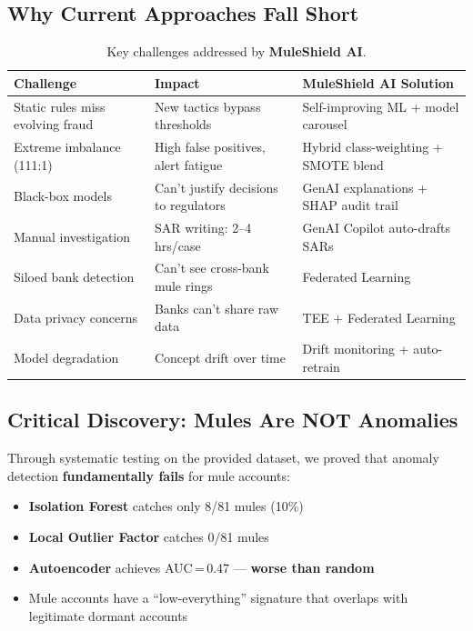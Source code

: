 \documentclass[11pt, a4paper]{article}
\newcommand{\muleshield}{\textbf{\textcolor{mainblue}{MuleShield AI}}}
\begin{document}
\subsection{Why Current Approaches Fall Short}

\begin{table}[H]
\centering
\small
{}
\begin{tabularx}{\textwidth}{L{3.5cm} Y Y}
\toprule
{}
\textbf{Challenge} & \textbf{Impact} & \textbf{MuleShield AI Solution} \\
\midrule
Static rules miss evolving fraud & New tactics bypass thresholds & Self-improving ML + model carousel \\
Extreme imbalance (111:1) & High false positives, alert fatigue & Hybrid class-weighting + SMOTE blend \\
Black-box models & Can't justify decisions to regulators & GenAI explanations + SHAP audit trail \\
Manual investigation & SAR writing: 2--4 hrs/case & GenAI Copilot auto-drafts SARs \\
Siloed bank detection & Can't see cross-bank mule rings & Federated Learning \\
Data privacy concerns & Banks can't share raw data & TEE + Federated Learning \\
Model degradation & Concept drift over time & Drift monitoring + auto-retrain \\
\bottomrule
\end{tabularx}
\caption{Key challenges addressed by \muleshield{}.}
\end{table}

\subsection{Critical Discovery: Mules Are NOT Anomalies}

Through systematic testing on the provided dataset, we proved that anomaly detection \textbf{fundamentally fails} for mule accounts:

\begin{itemize}
    \item \textbf{Isolation Forest} catches only 8/81 mules (10\%)
    \item \textbf{Local Outlier Factor} catches 0/81 mules
    \item \textbf{Autoencoder} achieves AUC\,=\,0.47 --- \textbf{worse than random}
    \item Mule accounts have a ``low-everything'' signature that overlaps with legitimate dormant accounts
\end{itemize}
\end{document}
